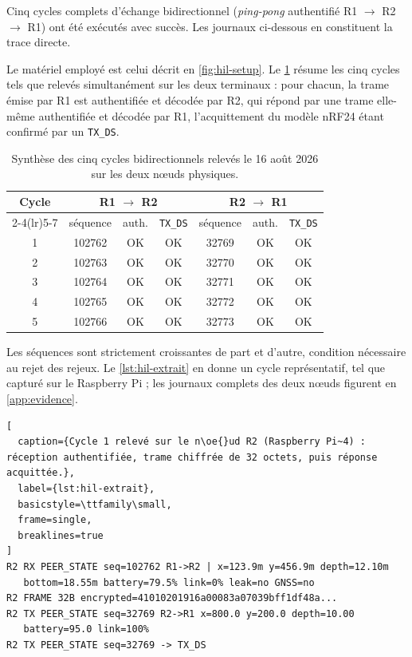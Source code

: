 Cinq cycles complets d'échange bidirectionnel (\emph{ping-pong} authentifié R1 $\rightarrow$ R2 $\rightarrow$ R1) ont été exécutés avec succès. Les journaux ci-dessous en constituent la trace directe.

Le matériel employé est celui décrit en \cref{fig:hil-setup}. Le \cref{tab:hil-cycles} résume les cinq cycles tels que relevés simultanément sur les deux terminaux : pour chacun, la trame émise par R1 est authentifiée et décodée par R2, qui répond par une trame elle-même authentifiée et décodée par R1, l'acquittement du modèle nRF24 étant confirmé par un \texttt{TX\_DS}.

\begin{table}[H]
  \centering
  \small
  \caption{Synthèse des cinq cycles bidirectionnels relevés le 16 août 2026 sur les deux n\oe{}uds physiques.}
  \label{tab:hil-cycles}
  \begin{tabular}{@{}ccccccc@{}}
    \toprule
    \textbf{Cycle} & \multicolumn{3}{c}{\textbf{R1 $\rightarrow$ R2}} & \multicolumn{3}{c}{\textbf{R2 $\rightarrow$ R1}} \\
    \cmidrule(lr){2-4}\cmidrule(lr){5-7}
    & séquence & auth. & \texttt{TX\_DS} & séquence & auth. & \texttt{TX\_DS} \\
    \midrule
    1 & 102762 & OK & OK & 32769 & OK & OK \\
    2 & 102763 & OK & OK & 32770 & OK & OK \\
    3 & 102764 & OK & OK & 32771 & OK & OK \\
    4 & 102765 & OK & OK & 32772 & OK & OK \\
    5 & 102766 & OK & OK & 32773 & OK & OK \\
    \bottomrule
  \end{tabular}
\end{table}

Les séquences sont strictement croissantes de part et d'autre, condition nécessaire au rejet des rejeux. Le \cref{lst:hil-extrait} en donne un cycle représentatif, tel que capturé sur le Raspberry Pi ; les journaux complets des deux n\oe{}uds figurent en \cref{app:evidence}.

\begin{lstlisting}[
  caption={Cycle 1 relevé sur le n\oe{}ud R2 (Raspberry Pi~4) : réception authentifiée, trame chiffrée de 32 octets, puis réponse acquittée.},
  label={lst:hil-extrait},
  basicstyle=\ttfamily\small,
  frame=single,
  breaklines=true
]
R2 RX PEER_STATE seq=102762 R1->R2 | x=123.9m y=456.9m depth=12.10m
   bottom=18.55m battery=79.5% link=0% leak=no GNSS=no
R2 FRAME 32B encrypted=41010201916a00083a07039bff1df48a...
R2 TX PEER_STATE seq=32769 R2->R1 x=800.0 y=200.0 depth=10.00
   battery=95.0 link=100%
R2 TX PEER_STATE seq=32769 -> TX_DS
\end{lstlisting}

